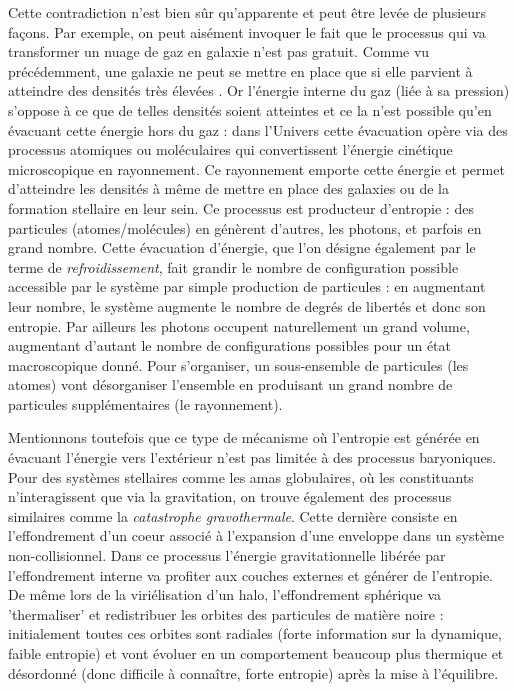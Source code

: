 Cette contradiction n'est bien sûr qu'apparente et peut être levée de plusieurs façons. Par exemple, on peut aisément invoquer le fait que le processus qui va transformer un nuage de gaz en galaxie n'est pas gratuit. Comme vu précédemment, une galaxie ne peut se mettre en place que si elle parvient à atteindre des densités très élevées . Or l'énergie interne du gaz (liée à sa pression) s'oppose à ce que de telles densités soient atteintes et ce la n'est possible qu'en évacuant cette énergie hors du gaz : dans l'Univers cette évacuation opère via des processus atomiques ou moléculaires qui convertissent l'énergie cinétique microscopique en rayonnement. Ce rayonnement emporte cette énergie et permet d'atteindre les densités à même de mettre en place des galaxies ou de la formation stellaire en leur sein. Ce processus est producteur d'entropie : des particules (atomes/molécules) en génèrent d'autres, les photons, et parfois en grand nombre. Cette évacuation d'énergie, que l'on désigne également par le terme de \textit{refroidissement}, fait grandir le nombre de configuration possible accessible par le système par simple production de particules : en augmentant leur nombre, le système augmente le nombre de degrés de libertés et donc son entropie. Par ailleurs les photons occupent naturellement un grand volume, augmentant d'autant le nombre de configurations possibles pour un état macroscopique donné.  Pour s'organiser, un sous-ensemble de particules (les atomes) vont désorganiser l'ensemble en produisant un grand nombre de particules supplémentaires (le rayonnement).

Mentionnons toutefois que ce type de mécanisme où l'entropie est générée en évacuant l'énergie vers l'extérieur n'est pas limitée à des processus baryoniques. Pour des systèmes stellaires comme les amas globulaires, où les constituants n'interagissent que via la gravitation, on trouve également des processus similaires comme la \textit{catastrophe gravothermale}. Cette dernière consiste en l'effondrement d'un coeur associé à l'expansion d'une enveloppe dans un système non-collisionnel. Dans ce processus l'énergie gravitationnelle libérée par l'effondrement interne va profiter aux couches externes et générer de l'entropie. De même lors de la viriélisation d'un halo, l'effondrement sphérique va 'thermaliser' et redistribuer les orbites des particules de matière noire : initialement toutes ces orbites sont radiales (forte information sur la dynamique, faible entropie) et vont évoluer en un comportement beaucoup plus thermique et désordonné (donc difficile à connaître, forte entropie) après la mise à l'équilibre.

